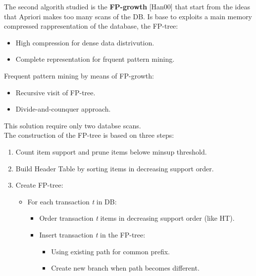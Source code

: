 \documentclass[12pt]{article}
\begin{document}
The second algorith studied is the \textbf{FP-growth} [Han00] that start from the ideas that Apriori makes too many scans of the DB. Is base to exploits a main memory compressed rappresentation of the database, the FP-tree:
\begin{itemize}
  \item High compression for dense data distrivution.
  \item Complete representation for frquent pattern mining.
\end{itemize}
Frequent pattern mining by means of FP-growth:
\begin{itemize}
  \item Recursive visit of FP-tree.
  \item Divide-and-counquer approach.
\end{itemize}
This solution require only two databse scans.\\
The construction of the FP-tree is based on three steps:
\begin{enumerate}
  \item Count item support and prune items belowe minsup threshold.
  \item Build Header Table by sorting items in decreasing support order.
  \item Create FP-tree:
  \begin{itemize}
    \item For each transaction \textit{t} in DB:
    \begin{itemize}
      \item Order transaction \textit{t} items in decreasing support order (like HT).
      \item Insert transaction \textit{t} in the FP-tree:
      \begin{itemize}
        \item Using existing path for common prefix.
        \item Create new branch when path becomes different.
      \end{itemize}
    \end{itemize}
  \end{itemize}
\end{enumerate}
\end{document}
